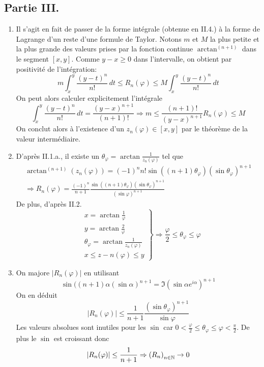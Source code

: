 \subsection*{Partie III.}
\begin{enumerate}
 \item Il s'agit en fait de passer de la forme intégrale (obtenue en II.4.) à la forme de Lagrange d'un reste d'une formule de Taylor. Notons $m$ et $M$ la plus petite et la plus grande des valeurs prises par la fonction continue $\arctan^{(n+1)}$ dans le segment $[x,y]$. Comme $y-x\geq0$ dans l'intervalle, on obtient par positivité de l'intégration:
\begin{displaymath}
 m\int_x^y\frac{(y-t)^n}{n!}\,dt 
\leq R_n(\varphi) \leq
M\int_x^y\frac{(y-t)^n}{n!}\,dt
\end{displaymath}
On peut alors calculer explicitement l'intégrale
\begin{displaymath}
 \int_x^y\frac{(y-t)^n}{n!}\,dt=\frac{(y-x)^{n+1}}{(n+1)!}
\Rightarrow
m\leq \frac{(n+1)!}{(y-x)^{n+1}}R_n(\varphi)\leq M
\end{displaymath}
On conclut alors à l'existence d'un $z_n(\varphi)\in [x,y]$ par le théorème de la valeur intermédiaire.

 \item D'après II.1.a., il existe un $\theta_\varphi=\arctan \frac{1}{z_n(\varphi)}$ tel que
\begin{multline*}
 \arctan^{(n+1)}(z_n(\varphi))=(-1)^nn!\sin\left((n+1)\theta_\varphi\right)\left(\sin \theta_\varphi\right)^{n+1}\\
\Rightarrow
R_n(\varphi) = 
\frac{(-1)^n}{n+1}\frac{\sin\left((n+1)\theta_\varphi\right)\left(\sin \theta_\varphi\right)^{n+1}}{(\sin \varphi)^{n+1}}  
\end{multline*}
De plus, d'après II.2.
\begin{displaymath}
 \left. 
\begin{aligned}
 &x=\arctan \frac{1}{\varphi} \\
&y=\arctan \frac{2}{\varphi} \\
&\theta_\varphi=\arctan \frac{1}{z_n(\varphi)} \\
&x\leq z-n(\varphi)\leq y
\end{aligned}
\right\rbrace 
\Rightarrow
\frac{\varphi}{2}\leq \theta_\varphi \leq \varphi
\end{displaymath}

 \item On majore $|R_n(\varphi)|$ en utilisant
\begin{displaymath}
 \sin((n+1)\alpha(\sin \alpha)^{n+1}=\Im\left(\sin \alpha e^{i\alpha} \right)^{n+1} 
\end{displaymath}
On en déduit
\begin{displaymath}
 |R_n(\varphi)|\leq \frac{1}{n+1}\frac{(\sin\theta_\varphi)^{n+1}}{\sin \varphi}
\end{displaymath}
Les valeurs absolues sont inutiles pour les $\sin$ car $0<\frac{\varphi}{2}\leq \theta_\varphi\leq \varphi <\frac{\pi}{2}$. De plus le $\sin$ est croissant donc 
\begin{displaymath}
 |R_n(\varphi)|\leq \frac{1}{n+1}\Rightarrow \left( R_n\right) _{n\in \mathbb{N}}\rightarrow 0
\end{displaymath}

\end{enumerate}
